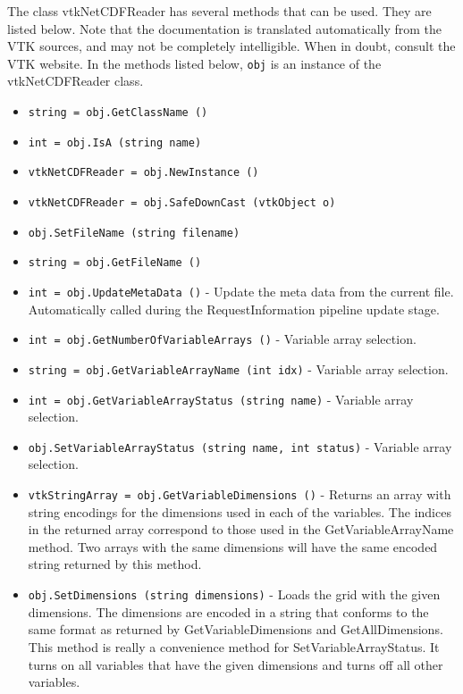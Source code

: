 The class vtkNetCDFReader has several methods that can be used.
  They are listed below.
Note that the documentation is translated automatically from the VTK sources,
and may not be completely intelligible.  When in doubt, consult the VTK website.
In the methods listed below, \verb|obj| is an instance of the vtkNetCDFReader class.
\begin{itemize}
\item  \verb|string = obj.GetClassName ()|

\item  \verb|int = obj.IsA (string name)|

\item  \verb|vtkNetCDFReader = obj.NewInstance ()|

\item  \verb|vtkNetCDFReader = obj.SafeDownCast (vtkObject o)|

\item  \verb|obj.SetFileName (string filename)|

\item  \verb|string = obj.GetFileName ()|

\item  \verb|int = obj.UpdateMetaData ()| -  Update the meta data from the current file.  Automatically called
 during the RequestInformation pipeline update stage.

\item  \verb|int = obj.GetNumberOfVariableArrays ()| -  Variable array selection.

\item  \verb|string = obj.GetVariableArrayName (int idx)| -  Variable array selection.

\item  \verb|int = obj.GetVariableArrayStatus (string name)| -  Variable array selection.

\item  \verb|obj.SetVariableArrayStatus (string name, int status)| -  Variable array selection.

\item  \verb|vtkStringArray = obj.GetVariableDimensions ()| -  Returns an array with string encodings for the dimensions used in each of
 the variables.  The indices in the returned array correspond to those used
 in the GetVariableArrayName method.  Two arrays with the same dimensions
 will have the same encoded string returned by this method.

\item  \verb|obj.SetDimensions (string dimensions)| -  Loads the grid with the given dimensions.  The dimensions are encoded in a
 string that conforms to the same format as returned by
 GetVariableDimensions and GetAllDimensions.  This method is really a
 convenience method for SetVariableArrayStatus.  It turns on all variables
 that have the given dimensions and turns off all other variables.


\end{itemize}

